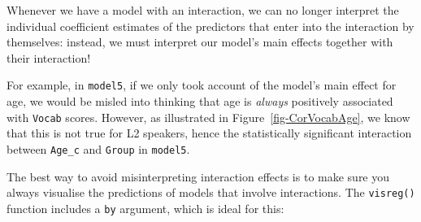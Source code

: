 \documentclass[
  letterpaper,
  DIV=11,
  numbers=noendperiod]{scrreprt}
\newenvironment{Shaded}{\begin{snugshade}}{\end{snugshade}}
\newcommand{\AttributeTok}[1]{\textcolor[rgb]{0.40,0.45,0.13}{#1}}
\newcommand{\ConstantTok}[1]{\textcolor[rgb]{0.56,0.35,0.01}{#1}}
\newcommand{\ControlFlowTok}[1]{\textcolor[rgb]{0.00,0.23,0.31}{\textbf{#1}}}
\newcommand{\FunctionTok}[1]{\textcolor[rgb]{0.28,0.35,0.67}{#1}}
\newcommand{\NormalTok}[1]{\textcolor[rgb]{0.00,0.23,0.31}{#1}}
\newcommand{\SpecialCharTok}[1]{\textcolor[rgb]{0.37,0.37,0.37}{#1}}
\newcommand{\StringTok}[1]{\textcolor[rgb]{0.13,0.47,0.30}{#1}}
\begin{document}
\begin{tcolorbox}[enhanced jigsaw, arc=.35mm, bottomrule=.15mm, bottomtitle=1mm, breakable, colback=white, colbacktitle=quarto-callout-caution-color!10!white, colframe=quarto-callout-caution-color-frame, coltitle=black, left=2mm, leftrule=.75mm, opacityback=0, opacitybacktitle=0.6, rightrule=.15mm, title=\textcolor{quarto-callout-caution-color}{\faFire}\hspace{0.5em}{Important}, titlerule=0mm, toprule=.15mm, toptitle=1mm]

Whenever we have a model with an interaction, we can no longer interpret
the individual coefficient estimates of the predictors that enter into
the interaction by themselves: instead, we must interpret our model's
main effects together with their interaction!

For example, in \texttt{model5}, if we only took account of the model's
main effect for age, we would be misled into thinking that age is
\emph{always} positively associated with \texttt{Vocab} scores. However,
as illustrated in Figure~\ref{fig-CorVocabAge}, we know that this is not
true for L2 speakers, hence the statistically significant interaction
between \texttt{Age\_c} and \texttt{Group} in \texttt{model5}.

\end{tcolorbox}

The best way to avoid misinterpreting interaction effects is to make
sure you always visualise the predictions of models that involve
interactions. The \texttt{visreg()} function includes a \texttt{by}
argument, which is ideal for this:

\begin{Shaded}
\end{Shaded}
\end{document}
